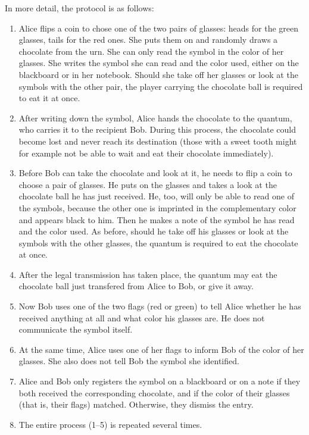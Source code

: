 \documentclass[prb,amssymb,preprint]{revtex4}
\begin{document}
In more detail, the protocol is as follows:

\begin{enumerate}

\item Alice flips a coin to chose one of the two pairs of glasses: heads
for the green glasses, tails for the red ones. She puts them on and randomly
draws a chocolate from the urn. She can only read the symbol in the color
of her glasses.  She
writes the symbol she can read and the color used, either on the blackboard
or in her notebook. Should she take off her glasses or look at
the symbols with the other pair, the player carrying the chocolate ball
is required to eat it
at once.

\item After writing down the symbol, Alice hands the chocolate to the
quantum, who carries it to the recipient Bob. During this process,
the chocolate could become lost and never reach its destination (those with
a sweet tooth might for example not be able to wait and eat their chocolate
immediately).

\item Before Bob can take the chocolate and look at it, he needs to
flip a coin to choose a pair of glasses. He puts on the glasses and takes a
look at the chocolate ball he has just received. He, too, will only be able
to read one of the symbols, because the other one is imprinted in the
complementary color and appears black to him. Then he makes a note of the
symbol he has read and the color used. As before, should he take off his
glasses or look at the symbols with the other glasses, the quantum is
required to eat the chocolate at once.

\item After the legal transmission has taken place, the quantum may eat the
chocolate ball just transfered from Alice to Bob, or give it away.

\item Now Bob uses one of the two flags (red or green) to tell Alice whether
he has received anything at all and what color his glasses are. He does not
communicate the symbol itself.

\item At the same time, Alice uses one of her flags to inform Bob of the
color of her glasses. She also does not tell Bob the symbol she identified.

\item
Alice and Bob only registers the symbol on a blackboard or on a note
if they both received the corresponding chocolate, and if the
color of their glasses (that is, their flags) matched. Otherwise, they
dismiss the entry.

\item The entire process (1--5) is repeated several times.
\end{enumerate}
\end{document}
